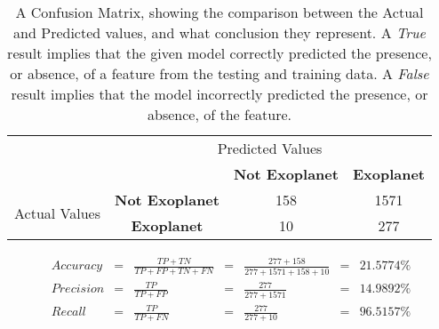 
    \renewcommand{\arraystretch}{2}
    \renewcommand{\tabcolsep}{20.25pt}
    \begin{table}[ht]
    \begin{tabular}{cccc}
     & \multicolumn{3}{c}{Predicted Values} \\ \cline{3-4}
     & \multicolumn{1}{c|}{} & \multicolumn{1}{c|}{\textbf{Not Exoplanet}} & \multicolumn{1}{c|}{\textbf{Exoplanet}} \\ \cline{2-4}
    \multicolumn{1}{c|}{\multirow{2}{2.0cm}{Actual Values}} & \multicolumn{1}{c|}{\textbf{Not Exoplanet}} & \multicolumn{1}{c|}{158} & \multicolumn{1}{c|}{1571} \\ \cline{2-4}
    \multicolumn{1}{c|}{} & \multicolumn{1}{c|}{\textbf{Exoplanet}} & \multicolumn{1}{c|}{10} & \multicolumn{1}{c|}{277} \\ \cline{2-4}
    \end{tabular}
    \caption{A Confusion Matrix, showing the comparison between the Actual and Predicted values, and what conclusion they represent. A \emph{True} result implies that the given model correctly predicted the presence, or absence, of a feature from the testing and training data. A \emph{False} result implies that the model incorrectly predicted the presence, or absence, of the feature.}
    \label{tab:sklearn-NB-gaussconfusionmatrix}
    \end{table}

    \label{eq:precisionsklearn-NB-gauss}
    \begin{align*}
        Accuracy &= &\frac{TP + TN}{TP + FP + TN + FN} &= &\frac{277 + 158}{277 + 1571 + 158 + 10} &= & 21.5774\% \\
        Precision &= &\frac{TP}{TP + FP} &= &\frac{277}{277 + 1571} &= & 14.9892\% \\
        Recall &= &\frac{TP}{TP + FN} &= &\frac{277}{277 + 10} &= & 96.5157\% \\
    \end{align*}

    \renewcommand{\arraystretch}{1}
    \renewcommand{\tabcolsep}{5.25pt}
    